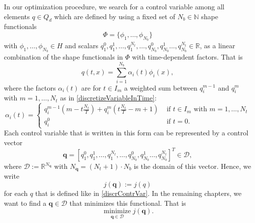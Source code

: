 In our optimization procedure, we search for a control variable among all elements $q\in Q_d$ which are defined by using a fixed set of $N_b\in\mathbb{N}$ shape functionals
\begin{equation}
\label{basisFuncionsList}
\Phi=\{\phi_1,\dotsc,\phi_{N_b}\}
\end{equation}
 with $\phi_1,\dotsc,\phi_{N_b}\in H$ and scalars $q_1^0,q_1^1,\dotsc,q_1^{N_t},\dotsc,q_{N_b}^0,q_{N_b}^1\dotsc,q_{N_b}^{N_t}\in\mathbb{R}$, as a linear combination of the shape functionals in $\Phi$ with time-dependent factors. That is
\begin{equation}
\label{discrContrVar}
q(t,x) = \sum_{i=1}^{N_b}\alpha_i(t)\phi_i(x),
\end{equation} 
where the factors $\alpha_i(t)$ are for $t\in I_m$ a weighted sum between $q^{m-1}_i$ and $q^m_i$ with $m=1,\dotsc,N_t$ as in \eqref{discretizeVariableInTime}:
\begin{displaymath}
\alpha_i(t)=\begin{cases}
q_i^{m-1}\left(m-t\frac{N_t}{T}\right) + q_i^m\left(t\frac{N_t}{T}-m+1\right) & \text{ if $t\in I_m$ with $m=1,\dotsc,N_t$}\\
q_i^0 & \text{ if $t=0$.}
\end{cases}
\end{displaymath}
Each control variable that is written in this form can be represented by a control vector
\begin{displaymath}
\mathbf{q}=\left[q_1^0,q_1^1,\dotsc,q_1^{N_t},\dotsc,q_{N_b}^0,q_{N_b}^1\dotsc,q_{N_b}^{N_t}\right]^T\in\mathcal{D},
\end{displaymath} 
where $\mathcal{D}:=\mathbb{R}^{N_\mathbf{q}}$ with $N_\mathbf{q} = (N_t+1)\cdot N_b$ is the domain of this vector. Hence, we write
\begin{equation}
\label{FOMFunctionalEvaluationDef}
j(\mathbf{q}):=j(q)
\end{equation}
for each $q$ that is defined like in \eqref{discrContrVar}. In the remaining chapters, we want to find a $\mathbf{q}\in\mathcal{D}$ that minimizes this functional. That is
\begin{equation}
\label{FOMOptimizationProblemDef}
\operatorname*{minimize}_{\mathbf{q}\in\mathcal{D}}j(\mathbf{q}).
\end{equation}

